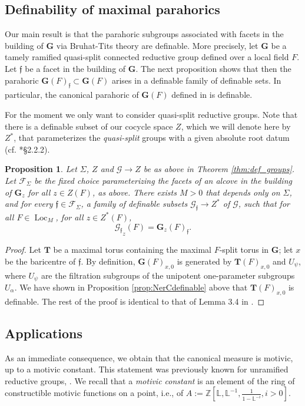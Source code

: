 \documentclass{amsart}
\newcommand{\Z}{{\mathbb Z}}
\newcommand{\cF}{\mathcal{F}}
\newcommand{\loc}{\operatorname{Loc}}
\newcommand{\bG}{\mathbf{G}}
\newcommand{\bT}{\mathbf {T}}
\newcommand{\cG}{\mathcal{G}}
\newcommand{\ff}{{\mathfrak f}}
\newcommand\lef{\mathbb L}
\theoremstyle{plain}
\newtheorem{prop}[thm]{Proposition}
\theoremstyle{definition}
\begin{document}
\subsection{Definability of maximal parahorics} 
Our main result is that 
the parahoric subgroups associated with facets in the building of $\bG$ via Bruhat-Tits theory are definable.  
More precisely, let $\bG$ be a tamely ramified quasi-split connected reductive group defined over a local field $F$. Let $\ff$ be a facet in the building of $\bG$.  The next proposition shows that
then the parahoric $\bG(F)_\ff\subset \bG(F)$ arises in a definable family of definable sets. 
In particular, the canonical parahoric of $\bG(F)$ defined in \cite{gross:motive} is definable. 

For the moment we only want to consider quasi-split reductive groups. 
Note that there is a definable subset of our cocycle space $Z$, which we will denote here by $Z^\ast$,  that parameterizes the \emph{quasi-split} groups with a given absolute root datum (cf. \cite{hales:transfert}*{\S 2.2.2}).  

\begin{prop}\label{prop:main}
 Let $\Sigma$, $Z$ and $\cG\to Z$ be as above in Theorem \ref{thm:def_groups}. Let 
 $\cF_{\Sigma}$ be the fixed choice parameterizing the facets of an alcove in the building of $\bG_z$ for all $z\in Z(F)$, as above.  
There exists $M>0$ that depends only on $\Sigma$, and for every $\ff\in \cF_\Sigma$, a family of definable subsets $\cG_{\ff} \to Z^\ast$ of $\cG$, such that for all $F\in \loc_M$, for all $z\in Z^\ast(F)$, 
$${\cG_{\ff}}_{z}(F)= \bG_z(F)_{\ff}.$$
\end{prop}

\begin{proof} Let $\bT$ be a maximal torus containing the maximal $F$-split torus in $\bG$; let $x$ be the baricentre of $\ff$.
By definition, $\bG(F)_{x,0}$ is generated by $\bT(F)_{x, 0}$ and $U_\psi$, where $U_\psi$ are the filtration subgroups of the unipotent one-parameter subgroups $U_{\alpha}$. 
We have shown in Proposition \ref{prop:NerCdefinable} above that  $\bT(F)_{x, 0}$ is definable. The rest of the proof is identical to that of Lemma 3.4 in \cite{CGH-2}.  
\end{proof} 

\subsection{Applications} 
As an immediate consequence, we obtain that the canonical measure is motivic, up to a motivic constant. This statement was previously known for unramified reductive groups, \cite{cluckers-hales-loeser}.
We recall that a \emph{motivic constant} is an element of the ring of constructible motivic functions on a point, i.e.,  of $A:=\Z[\lef, \lef^{-1}, \frac{1}{1-\lef^{-i}}, i>0]$. 
 
\end{document}
